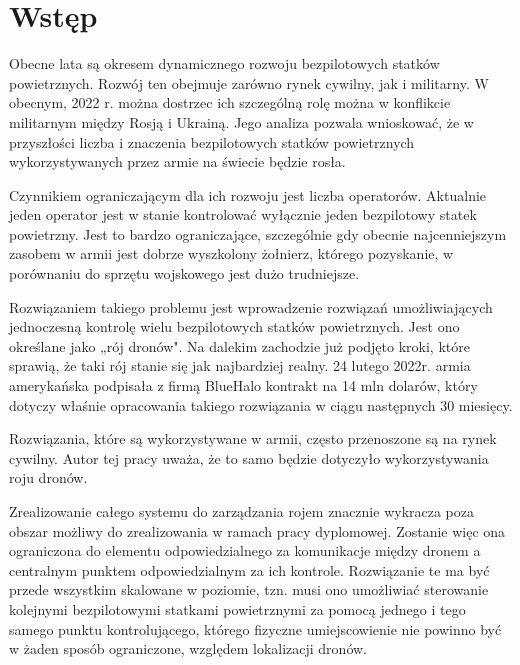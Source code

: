 

\newcommand{\kierunek}{INFORMATYKA}
\newcommand{\stopien}{STUDIA II$^{\mathrm{o}}$} %
\newcommand{\temat}{MOBILNY SYSTEM ZARZĄDZANIA I STEROWANIA BEZPILOTOWYM STATKIEM LATAJĄCYM}
\newcommand{\data}{Warszawa 2022}
\newcommand{\autor}{Norbert WASZKOWIAK}
\newcommand{\promotor}{dr inż. Michał DYK}
\newcommand{\zgoda}{TAK} %
\newcommand{\specjalnosc}{SYSTEMY INFORMATYCZNE}

\newcommand{\bibTitle}[1]{``#1''}




\inserttitlepage

\section*{Wstęp} 


Obecne lata są okresem dynamicznego rozwoju bezpilotowych statków powietrznych. Rozwój ten obejmuje zarówno rynek cywilny, jak i militarny. W obecnym, 2022 r. można dostrzec ich szczególną rolę można w konflikcie militarnym między Rosją i Ukrainą. Jego analiza pozwala wnioskować, że w przyszłości liczba i znaczenia bezpilotowych statków powietrznych wykorzystywanych przez armie na świecie będzie rosła.

Czynnikiem ograniczającym dla ich rozwoju jest liczba operatorów. Aktualnie jeden operator jest w stanie kontrolować wyłącznie jeden bezpilotowy statek powietrzny. Jest to bardzo ograniczające, szczególnie gdy obecnie najcenniejszym zasobem w armii jest dobrze wyszkolony żołnierz, którego pozyskanie, w porównaniu do sprzętu wojskowego jest dużo trudniejsze.

Rozwiązaniem takiego problemu jest wprowadzenie rozwiązań umożliwiających jednoczesną kontrolę wielu bezpilotowych statków powietrznych. Jest ono określane jako „rój dronów". Na dalekim zachodzie już podjęto kroki, które sprawią, że taki rój stanie się jak najbardziej realny. 24 lutego 2022r. armia amerykańska podpisała z firmą BlueHalo kontrakt na 14 mln dolarów, który dotyczy właśnie opracowania takiego rozwiązania w ciągu następnych 30 miesięcy. \cite{usa-roj}

Rozwiązania, które są wykorzystywane w armii, często przenoszone są na rynek cywilny. Autor tej pracy uważa, że to samo będzie dotyczyło wykorzystywania roju dronów.

Zrealizowanie całego systemu do zarządzania rojem znacznie wykracza poza obszar możliwy do zrealizowania w ramach pracy dyplomowej. Zostanie więc ona ograniczona do elementu odpowiedzialnego za komunikacje między dronem a centralnym punktem odpowiedzialnym za ich kontrole. Rozwiązanie te ma być przede wszystkim skalowane w poziomie, tzn. musi ono umożliwiać sterowanie kolejnymi bezpilotowymi statkami powietrznymi za pomocą jednego i tego samego punktu kontrolującego, którego fizyczne umiejscowienie nie powinno być w żaden sposób ograniczone, względem lokalizacji dronów.

